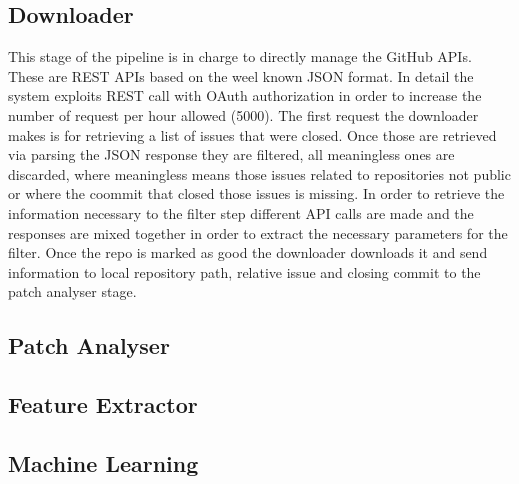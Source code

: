 \subsection{Downloader}
This stage of the pipeline is in charge to directly manage the GitHub APIs. These are REST APIs based on the weel known JSON format. In detail the system exploits REST call with OAuth authorization in order to increase the number of request per hour allowed (5000). The first request the downloader makes is for retrieving a list of issues that were closed. Once those are retrieved via parsing the JSON response they are filtered, all meaningless ones are discarded, where meaningless means those issues related to repositories not public or where the coommit that closed those issues is missing. In order to retrieve the information necessary to the filter step different API calls are made and the responses are mixed together in order to extract the necessary parameters for the filter. Once the repo is marked as good the downloader downloads it and send information to local repository path, relative issue and closing commit to the patch analyser stage. 
\subsection{Patch Analyser}
\subsection{Feature Extractor}
\subsection{Machine Learning} 

